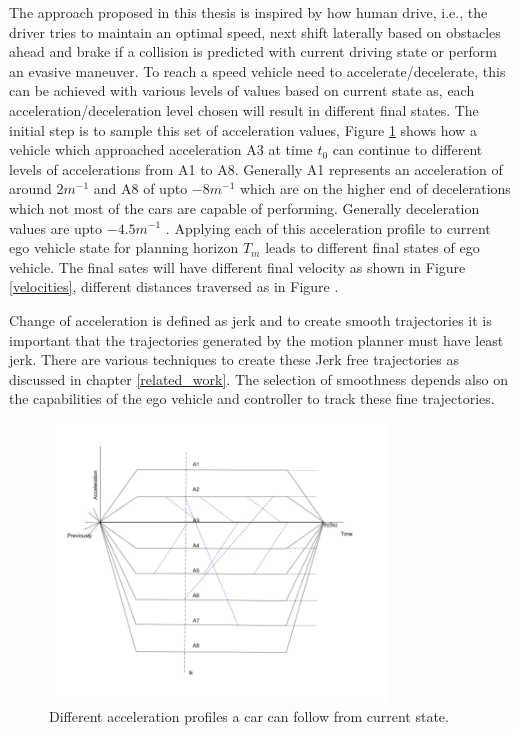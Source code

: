 The approach proposed in this thesis is inspired by how human drive, i.e., the driver tries to maintain an optimal speed, next shift laterally based on obstacles ahead and brake if a collision is predicted with current driving state or perform an evasive maneuver. To reach a speed vehicle need to accelerate/decelerate, this can be achieved with various levels of values based on current state as, each acceleration/deceleration level chosen will result in different final states. The initial step is to sample this set of acceleration values, Figure \ref{accelerations} shows how a vehicle which approached acceleration A3 at time $t_0$ can continue to different levels of accelerations from A1 to A8. Generally A1 represents an acceleration of around $2m^{-1}$ and A8 of upto $-8m^{-1}$ which are on the higher end of decelerations which not most of the cars are capable of performing. Generally deceleration values are upto $-4.5m^{-1}$ \cite{denmark_breaking} \cite{accelerations_study} \cite{accelerations_study_2}. Applying each of this acceleration profile to current ego vehicle state for planning horizon $ T_m $ leads to different final states of ego vehicle. The final sates will have different final velocity as shown in Figure \ref{velocities}, different distances traversed as in Figure  . 

Change of acceleration is defined as jerk and to create smooth trajectories it is important that the trajectories generated by the motion planner must have least jerk. There are various techniques to create these Jerk free trajectories as discussed in chapter \ref{related_work}. The selection of smoothness depends also on the capabilities of the ego vehicle and controller to track these fine trajectories.
 
 \begin{figure}[H]
    \centering
    \includegraphics[width=0.8\textwidth]{Images/accelerations.png}
    \caption{Different acceleration profiles a car can follow from current state.}
    \label{accelerations}
\end{figure}

